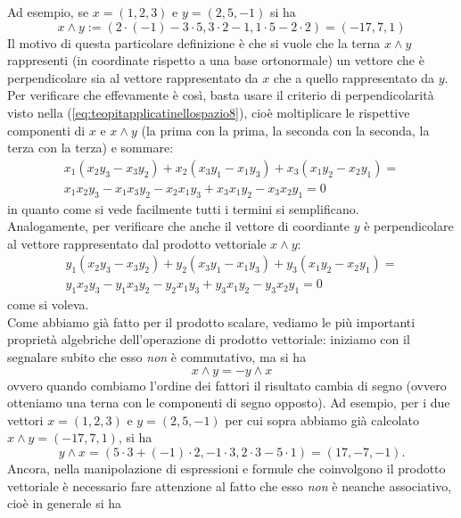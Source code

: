 \documentclass{book}
\theoremstyle{definition}
\theoremstyle{plain}
\begin{document}
Ad esempio, se $x=(1,2,3)$ e $y=(2,5,-1)$ si ha
\begin{equation*}
  x\wedge y := (2\cdot (-1)-3\cdot 5, 3\cdot 2-1,1\cdot 5-2\cdot 2) = (-17,7,1)
\end{equation*}
Il motivo di questa particolare definizione è che si vuole che la terna $x \wedge y$ rappresenti (in coordinate rispetto a una base ortonormale) un vettore che è perpendicolare sia al vettore rappresentato da $x$ che a quello rappresentato da $y$.\\
Per verificare che effevamente è così, basta usare il criterio di perpendicolarità visto nella (\ref{eq:teopitapplicatinellospazio8}), cioè moltiplicare le rispettive componenti di $x$ e $x\wedge y$ (la prima con la prima, la seconda con la seconda, la terza con la terza) e sommare:
\begin{eqnarray*}
  x_1(x_2y_3-x_3y_2)+x_2(x_3y_1-x_1y_3)+x_3(x_1y_2-x_2y_1)=\\
  x_1x_2y_3-x_1x_3y_2-x_2x_1y_3+x_3x_1y_2-x_3x_2y_1=0
\end{eqnarray*}
in quanto come si vede facilmente tutti i termini si semplificano.\\
Analogamente, per verificare che anche il vettore di coordiante $y$ è perpendicolare al vettore rappresentato dal prodotto vettoriale $x\wedge y$:
\begin{eqnarray*}
  y_1(x_2y_3-x_3y_2)+y_2(x_3y_1-x_1y_3)+y_3(x_1y_2-x_2y_1)=\\
  y_1x_2y_3-y_1x_3y_2-y_2x_1y_3+y_3x_1y_2-y_3x_2y_1=0
\end{eqnarray*}
come si voleva.\\
Come abbiamo già fatto per il prodotto scalare, vediamo le più importanti proprietà algebriche dell'operazione di prodotto vettoriale: iniziamo con il segnalare subito che esso \textit{non} è commutativo, ma si ha
\begin{equation*}
  x\wedge y=-y\wedge x
\end{equation*}
ovvero quando combiamo l'ordine dei fattori il risultato cambia di segno (ovvero otteniamo una terna con le componenti di segno opposto). Ad esempio, per i due vettori $x=(1,2,3)$ e $y=(2,5,-1)$ per cui sopra abbiamo già calcolato $x\wedge y=(-17,7,1)$, si ha
\begin{equation*}
  y\wedge x=(5\cdot 3+(-1)\cdot 2, -1\cdot 3, 2\cdot 3-5\cdot 1)=(17, -7, -1).
\end{equation*}
Ancora, nella manipolazione di espressioni e formule che coinvolgono il prodotto vettoriale è necessario fare attenzione al fatto che esso \textit{non} è neanche associativo, cioè in generale si ha
\end{document}
